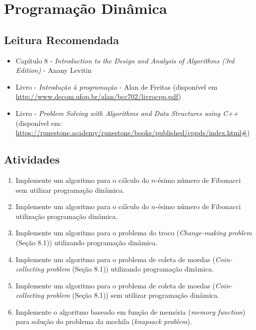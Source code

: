 \documentclass{article}
\begin{document}
\begin{enumerate}
\end{enumerate}

\section{Programação Dinâmica}

\subsection{Leitura Recomendada}

\begin{itemize}
    \item Capítulo 8 - \textit{Introduction to the Design and Analysis of Algorithms (3rd Edition)} - Anany Levitin 
    \item Livro - \textit{Introdução à programação} - Alan de Freitas (disponível em \url{http://www.decom.ufop.br/alan/bcc702/livrocpp.pdf})
    \item Livro - \textit{Problem Solving with Algorithms and Data Structures using C++} (disponível em: \url{https://runestone.academy/runestone/books/published/cppds/index.html#})
\end{itemize}

\subsection{Atividades}

\begin{enumerate}
    \item Implemente um algoritmo para o cálculo do $n$-ésimo número de Fibonacci sem utilizar programação dinâmica.
    \item Implemente um algoritmo  para o cálculo do $n$-ésimo número de Fibonacci utilização programação dinâmica.
    \item Implemente um algoritmo  para o problema do troco (\textit{Change-making problem} (Seção 8.1)) utilizando programação dinâmica.
    \item Implemente um algoritmo  para o problema de coleta de moedas (\textit{Coin-collecting problem} (Seção 8.1)) utilizando programação dinâmica. 
    \item Implemente um algoritmo para o problema de coleta de moedas (\textit{Coin-collecting problem} (Seção 8.1)) sem utilizar programação dinâmica. 
    \item Implemente o algoritmo baseado em função de memória (\textit{memory function}) para solução do problema da mochila (\textit{knapsack problem}). 
\end{enumerate}
\end{document}
